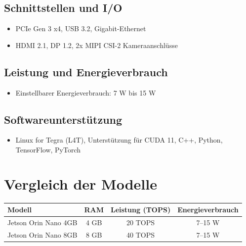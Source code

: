 \documentclass{article}
\begin{document}
\subsection{Schnittstellen und I/O}
\begin{itemize}
    \item PCIe Gen 3 x4, USB 3.2, Gigabit-Ethernet
    \item HDMI 2.1, DP 1.2, 2x MIPI CSI-2 Kameraanschlüsse
\end{itemize}

\subsection{Leistung und Energieverbrauch}
\begin{itemize}
    \item Einstellbarer Energieverbrauch: 7 W bis 15 W
\end{itemize}

\subsection{Softwareunterstützung}
\begin{itemize}
    \item Linux for Tegra (L4T), Unterstützung für CUDA 11, C++, Python, TensorFlow, PyTorch
\end{itemize}

\section{Vergleich der Modelle}

\begin{longtable}{|l|c|c|c|}
    \hline
    \textbf{Modell} & \textbf{RAM} & \textbf{Leistung (TOPS)} & \textbf{Energieverbrauch} \\
    \hline
    Jetson Orin Nano 4GB & 4 GB & 20 TOPS & 7–15 W \\
    Jetson Orin Nano 8GB & 8 GB & 40 TOPS & 7–15 W \\
    \hline
\end{longtable}
\end{document}
